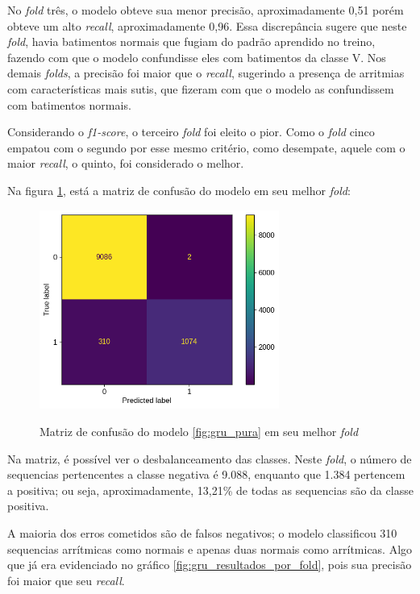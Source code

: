 No \textit{fold} três, o modelo obteve sua menor precisão, aproximadamente 0,51 porém obteve um alto \textit{recall}, aproximadamente 0,96.
Essa discrepância sugere que neste \textit{fold}, havia batimentos normais que fugiam do padrão aprendido no treino, fazendo com que o modelo
confundisse eles com batimentos da classe V. Nos demais \textit{folds}, a precisão foi maior que o \textit{recall}, sugerindo a presença 
de arritmias com características mais sutis, que fizeram com que o modelo as confundissem com batimentos normais.

Considerando o \textit{f1-score}, o terceiro \textit{fold} foi eleito o pior. Como o \textit{fold} cinco empatou com o segundo por 
esse mesmo critério, como desempate, aquele com o maior \textit{recall}, o quinto, foi considerado o melhor. 

Na figura \ref{fig:matriz_confusao_melhor_fold_gru}, está a matriz de confusão do modelo em seu melhor \textit{fold}:

\begin{figure}[H]
  \centering
  \caption{Matriz de confusão do modelo \ref{fig:gru_pura} em seu melhor \textit{fold}}
   \includegraphics[width=0.7\textwidth]{figuras/modelos_resultados/gru/matriz_confusao_melhor_fold_gru_alt.png} %
  \label{fig:matriz_confusao_melhor_fold_gru}
\end{figure}

Na matriz, é possível ver o desbalanceamento das classes. Neste \textit{fold}, o número de sequencias pertencentes a classe
negativa é 9.088, enquanto que 1.384 pertencem a positiva; ou seja, aproximadamente, 13,21\% de todas as sequencias são
da classe positiva. 

A maioria dos erros cometidos são de falsos negativos; o modelo classificou 310 sequencias arrítmicas como normais e 
apenas duas normais como arrítmicas. Algo que já era evidenciado no gráfico \ref{fig:gru_resultados_por_fold}, pois 
sua precisão foi maior que seu \textit{recall}.

